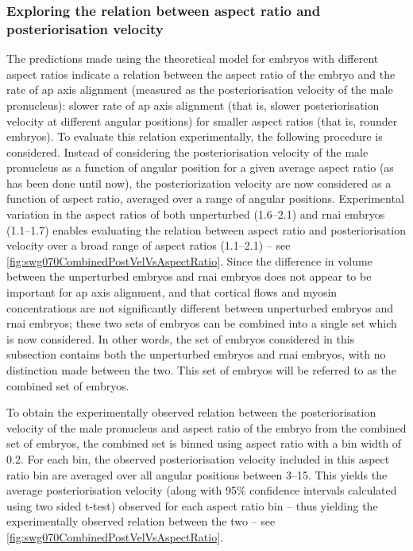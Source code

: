 \subsubsection{Exploring the relation between aspect ratio and posteriorisation velocity}\label{subsubsec:postVelVsAspectRatioExpAndModel}
The predictions made using the theoretical model for embryos with different aspect ratios indicate a relation between the aspect ratio of the embryo and the rate of \ac{ap} axis alignment (measured as the posteriorisation velocity of the male pronucleus): slower rate of \ac{ap} axis alignment (that is, slower posteriorisation velocity at different angular positions) for smaller aspect ratios (that is, rounder embryos). To evaluate this relation experimentally, the following procedure is considered. Instead of considering the posteriorisation velocity of the male pronucleus as a function of angular position for a given average aspect ratio (as has been done until now), the posteriorization velocity are now considered as a function of aspect ratio, averaged over a range of angular positions. Experimental variation in the aspect ratios of both unperturbed (\numrange{1.6}{2.1}) and  \ac{rnai} embryos (\numrange{1.1}{1.7}) enables evaluating the relation between aspect ratio and posteriorisation velocity over a broad range of aspect ratios (\numrange{1.1}{2.1}) -- see \autoref{fig:swg070CombinedPostVelVsAspectRatio}. Since the difference in volume between the unperturbed embryos and \ac{rnai} embryos does not appear to be important for \ac{ap} axis alignment, and that cortical flows and myosin concentrations are not significantly different between unperturbed embryos and  \ac{rnai} embryos; these two sets of embryos can be combined into a single set which is now considered. In other words, the set of embryos considered in this subsection contains both the unperturbed embryos and  \ac{rnai} embryos, with no distinction made between the two. This set of embryos will be referred to as the combined set of embryos.

To obtain the experimentally observed relation between the posteriorisation velocity of the male pronucleus and aspect ratio of the embryo from the combined set of embryos, the combined set is binned using aspect ratio with a bin width of \num{0.2}. For each bin, the observed posteriorisation velocity included in this aspect ratio bin are averaged over all angular positions between \SIrange{3}{15}{\unitAngle}. This yields the average posteriorisation velocity (along with \num{95}\% confidence intervals calculated using two sided t-test) observed for each aspect ratio bin -- thus yielding the experimentally observed relation between the two -- see \autoref{fig:swg070CombinedPostVelVsAspectRatio}.

